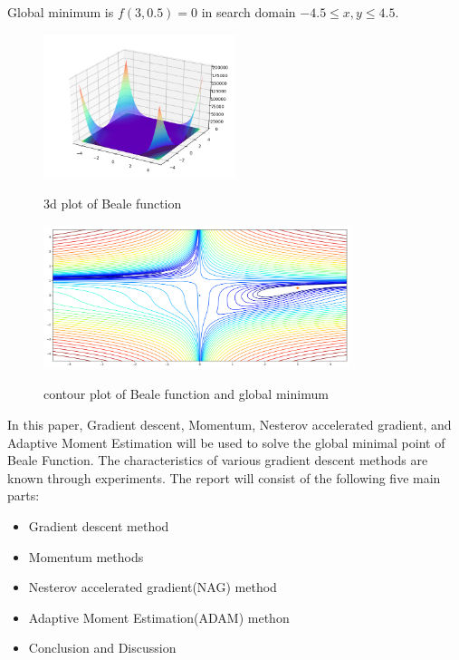 \documentclass[aps,letterpaper,10pt]{article}
\begin{document}
Global minimum is $f(3,0.5)=0$ in search domain $-4.5\leq x,y\leq 4.5$.

\begin{figure}[H]
  \centering
  \label{fig:Beale1}\includegraphics[width=0.5\textwidth]{3dplot.png}\
  \caption{3d plot of Beale function }
\end{figure}

\begin{figure}[H]
  \centering
  \label{fig:Beale2}\includegraphics[width=0.8\textwidth]{contour.png}\
  \caption{contour plot of Beale function and global minimum}
\end{figure}



In this paper, Gradient descent, Momentum, Nesterov accelerated gradient, and Adaptive Moment Estimation will be used to solve the global minimal point of Beale Function. The characteristics of various gradient descent methods are known through experiments. The report will consist of the following five main parts:
\begin{itemize}
	\item Gradient descent method
	\item Momentum methods
	\item Nesterov accelerated gradient(NAG) method
  \item Adaptive Moment Estimation(ADAM) methon
	\item Conclusion and Discussion
\end{itemize}
\vspace{3mm}
\end{document}
